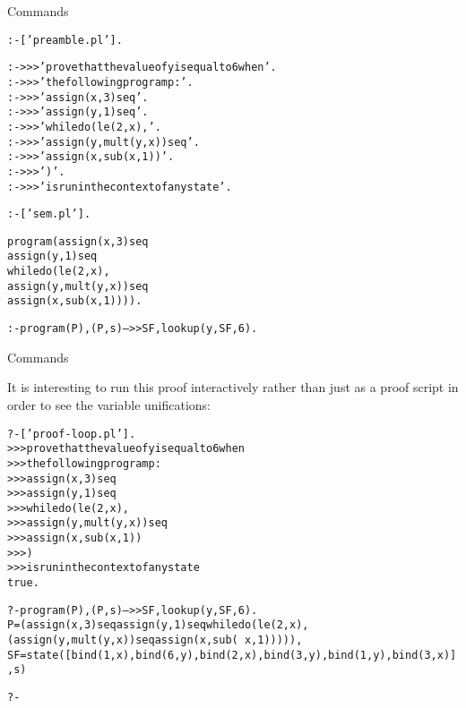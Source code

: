 \documentclass{beamer}
\begin{document}
\begin{frame}[fragile]{Commands}
\tiny
\begin{alltt}
% proof-loop.pl

:- ['preamble.pl'].

:- >>> 'prove that the value of y is equal to 6 when'.
:- >>> 'the following program p:'.
:- >>> '       assign(x,3) seq'.
:- >>> '       assign(y,1) seq'.
:- >>> '       whiledo(le(2,x),'.
:- >>> '               assign(y,mult(y,x)) seq'.
:- >>> '               assign(x,sub(x,1))'.
:- >>> '       )'.
:- >>> 'is run in the context of any state'.

% We need to prove
%           (forall s)(exists SF)[(p,s)-->>SF ^ lookup(y,SF,6)]                                 
                                                                                                
% proof                                                                                         
:- ['sem.pl'].                                                                                  
                                                                                                
% A nice coding trick for long proofs:                                                          
%   'program' is a predicate that holds our program                                             
program(assign(x,3) seq                                                                         
        assign(y,1) seq
        whiledo(le(2,x),
            assign(y,mult(y,x)) seq                                                             
            assign(x,sub(x,1)))).

:- program(P),(P,s)-->>SF,lookup(y,SF,6).      
\end{alltt}
\end{frame}


\begin{frame}[fragile]{Commands}

It is interesting to run this proof interactively rather than just as a proof script in order to
see the variable unifications:
\tiny
\begin{alltt}
?- ['proof-loop.pl'].
%   xis.pl compiled 0.00 sec, 6,920 bytes
%  preamble.pl compiled 0.00 sec, 8,108 bytes
>>> prove that the value of y is equal to 6 when
>>> the following program p:
>>>        assign(x,3) seq
>>>        assign(y,1) seq
>>>        whiledo(le(2,x),
>>>                assign(y,mult(y,x)) seq
>>>                assign(x,sub(x,1))
>>>        )
>>> is run in the context of any state
%    xis.pl compiled 0.00 sec, 136 bytes
%   preamble.pl compiled 0.00 sec, 264 bytes
%   xis.pl compiled 0.00 sec, 136 bytes
%  sem.pl compiled 0.00 sec, 5,960 bytes
% proof-loop.pl compiled 0.00 sec, 16,380 bytes
true.

?- program(P),(P,s)-->>SF,lookup(y,SF,6).
P = (assign(x, 3)seq assign(y, 1)seq whiledo(le(2, x), (assign(y, mult(y, x))seq assign(x, sub(\
x, 1))))),
SF = state([bind(1, x), bind(6, y), bind(2, x), bind(3, y), bind(1, y), bind(3, x)], s) 

?- 
\end{alltt}
\end{frame}
\end{document}
